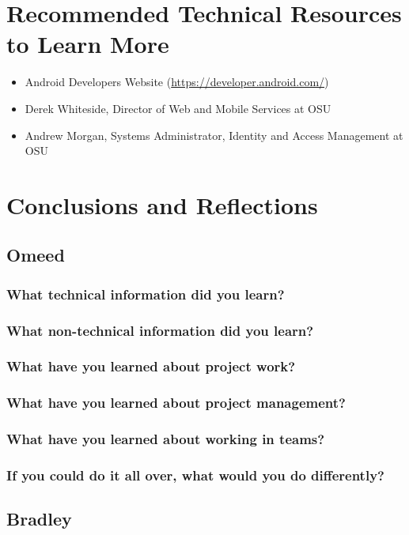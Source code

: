 \documentclass[onecolumn, draftclsnofoot,10pt, compsoc]{IEEEtran}
\begin{document}
\section{Recommended Technical Resources to Learn More}
  \begin{itemize}
    \item Android Developers Website (\url{https://developer.android.com/})
    \item Derek Whiteside, Director of Web and Mobile Services at OSU
    \item Andrew Morgan, Systems Administrator, Identity and Access Management at OSU
  \end{itemize}

\section{Conclusions and Reflections}
  \subsection{Omeed}
    \subsubsection{What technical information did you learn?}
    \subsubsection{What non-technical information did you learn?}
    \subsubsection{What have you learned about project work?}
    \subsubsection{What have you learned about project management?}
    \subsubsection{What have you learned about working in teams?}
    \subsubsection{\textbf{If you could do it all over, what would you do differently?}}

  \subsection{Bradley}
\end{document}
